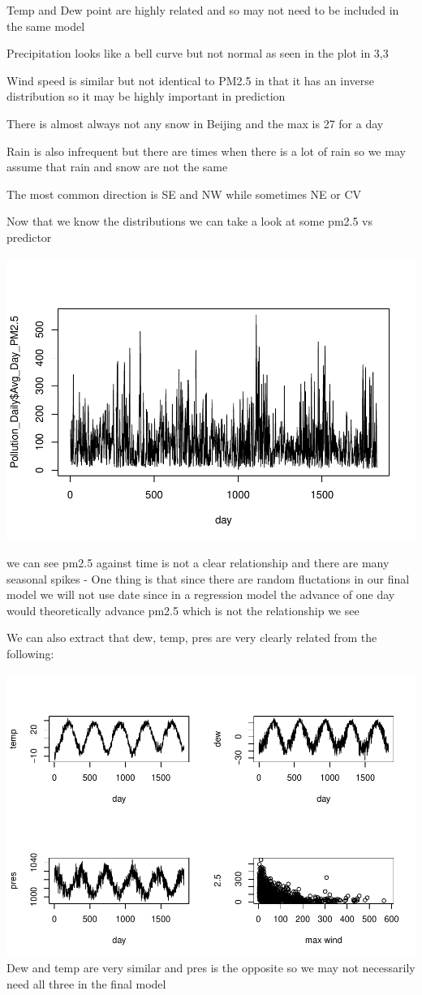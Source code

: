 \documentclass[
]{article}
\begin{document}
Temp and Dew point are highly related and so may not need to be included
in the same model

Precipitation looks like a bell curve but not normal as seen in the plot
in 3,3

Wind speed is similar but not identical to PM2.5 in that it has an
inverse distribution so it may be highly important in prediction

There is almost always not any snow in Beijing and the max is 27 for a
day

Rain is also infrequent but there are times when there is a lot of rain
so we may assume that rain and snow are not the same

The most common direction is SE and NW while sometimes NE or CV

Now that we know the distributions we can take a look at some pm2.5 vs
predictor

\includegraphics[width=0.9\linewidth,height=0.75\textheight]{Final_Project_2_files/figure-latex/unnamed-chunk-5-1}

we can see pm2.5 against time is not a clear relationship and there are
many seasonal spikes - One thing is that since there are random
fluctations in our final model we will not use date since in a
regression model the advance of one day would theoretically advance
pm2.5 which is not the relationship we see

We can also extract that dew, temp, pres are very clearly related from
the following:

\includegraphics[width=0.8\linewidth,height=0.8\textheight]{Final_Project_2_files/figure-latex/unnamed-chunk-6-1}
Dew and temp are very similar and pres is the opposite so we may not
necessarily need all three in the final model
\end{document}
